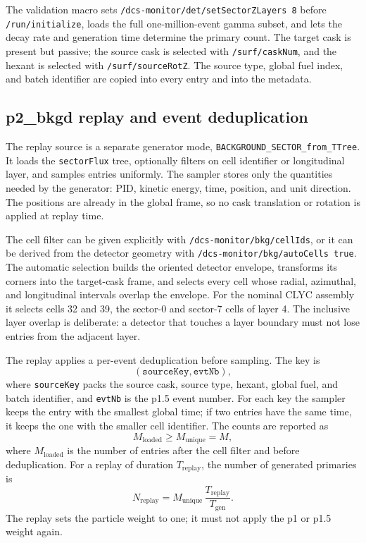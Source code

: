 \documentclass[11pt,a4paper]{article}
\begin{document}
The validation macro sets \texttt{/dcs-monitor/det/setSectorZLayers 8} before
\texttt{/run/initialize}, loads the full one-million-event gamma subset, and
lets the decay rate and generation time determine the primary count. The target
cask is present but passive; the source cask is selected with
\texttt{/surf/caskNum}, and the hexant is selected with
\texttt{/surf/sourceRotZ}. The source type, global fuel index, and batch
identifier are copied into every entry and into the metadata.

\subsection{p2\_bkgd replay and event deduplication}
\label{sec:replay}

The replay source is a separate generator mode,
\texttt{BACKGROUND\_SECTOR\_from\_TTree}. It loads the \texttt{sectorFlux} tree,
optionally filters on cell identifier or longitudinal layer, and samples entries
uniformly. The sampler stores only the quantities needed by the generator: PID,
kinetic energy, time, position, and unit direction. The positions are already in
the global frame, so no cask translation or rotation is applied at replay time.

The cell filter can be given explicitly with
\texttt{/dcs-monitor/bkg/cellIds}, or it can be derived from the detector
geometry with \texttt{/dcs-monitor/bkg/autoCells true}. The automatic selection
builds the oriented detector envelope, transforms its corners into the
target-cask frame, and selects every cell whose radial, azimuthal, and
longitudinal intervals overlap the envelope. For the nominal CLYC assembly it
selects cells 32 and 39, the sector-0 and sector-7 cells of layer 4. The
inclusive layer overlap is deliberate: a detector that touches a layer boundary
must not lose entries from the adjacent layer.

The replay applies a per-event deduplication before sampling. The key is
\begin{equation}
  (\texttt{sourceKey},\texttt{evtNb}),
\end{equation}
where \texttt{sourceKey} packs the source cask, source type, hexant, global fuel,
and batch identifier, and \texttt{evtNb} is the p1.5 event number. For each key
the sampler keeps the entry with the smallest global time; if two entries have
the same time, it keeps the one with the smaller cell identifier. The counts are
reported as
\begin{equation}
  M_{\mathrm{loaded}} \ge M_{\mathrm{unique}} = M,
\end{equation}
where $M_{\mathrm{loaded}}$ is the number of entries after the cell filter and
before deduplication. For a replay of duration $T_{\mathrm{replay}}$, the number
of generated primaries is
\begin{equation}
  N_{\mathrm{replay}}=M_{\mathrm{unique}}\,
  \frac{T_{\mathrm{replay}}}{T_{\mathrm{gen}}}.
  \label{eq:replay}
\end{equation}
The replay sets the particle weight to one; it must not apply the p1 or p1.5
weight again.
\end{document}
